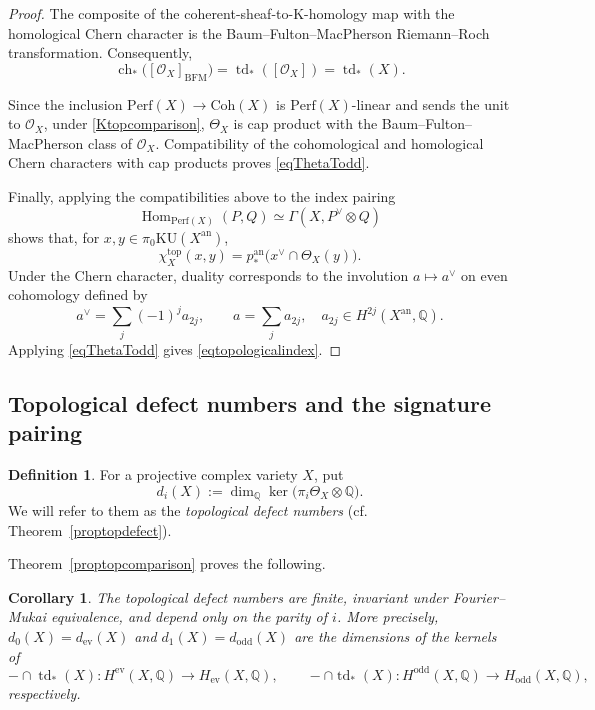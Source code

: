 \documentclass{amsart}
\theoremstyle{plain}
\newtheorem{corollary}[prop]{Corollary}
\theoremstyle{definition}
\newtheorem{defi}[prop]{Definition}
\newcommand{\bbQ}{\mathbb{Q}}
\newcommand{\Perf}{\mathrm{Perf}}
\newcommand{\K}{\mathrm{K}}
\newcommand{\KU}{\mathrm{KU}}
\newcommand{\Coh}{\mathrm{Coh}}
\DeclareMathOperator{\Hom}{Hom}
\DeclareMathOperator{\td}{td}
\newcommand{\an}{\mathrm{an}}
\begin{document}
\begin{proof}
The composite of the coherent-sheaf-to-$\K$-homology map with the homological Chern character is the Baum--Fulton--MacPherson Riemann--Roch transformation.
Consequently,
\[
\operatorname{ch}_*
\bigl([\mathcal O_X]_{\mathrm{BFM}}\bigr)
=\td_*([\mathcal O_X])=\td_*(X).
\]

Since the inclusion $\Perf(X)\to\Coh(X)$ is $\Perf(X)$-linear and sends the unit to $\mathcal O_X$, under \eqref{Ktopcomparison}, $\Theta_X$
is cap product with the Baum--Fulton--MacPherson class of $\mathcal O_X$. Compatibility of the cohomological and homological Chern characters with cap products proves \eqref{eqThetaTodd}.

Finally, applying the compatibilities above to the index pairing
\[
\Hom_{\Perf(X)}(P,Q)\simeq\Gamma(X,P^\vee\otimes Q)
\]
shows that, for
$x,y\in\pi_0\KU(X^\an)$,
\[
\chi_X^{\mathrm{top}}(x,y)
=
p^\an_*\bigl(x^\vee\cap\Theta_X(y)\bigr).
\] 
Under the Chern character, duality corresponds to the involution
$a\mapsto a^\vee$ on even cohomology defined by
\[
a^\vee=\sum_j(-1)^j a_{2j},
\qquad a=\sum_j a_{2j},\quad a_{2j}\in H^{2j}(X^\an,\bbQ).
\]
Applying \eqref{eqThetaTodd}
gives \eqref{eqtopologicalindex}.
\end{proof}




\subsection{Topological defect numbers and the signature pairing}

\begin{defi}\label{defitopdefect}
For a projective complex variety $X$, put
\begin{equation}\label{eqtopologicalkerneldimensions}
d_i(X):=\dim_{\bbQ}\ker\bigl(\pi_i\Theta_X\otimes\bbQ\bigr).
\end{equation}
We will refer to them as the \emph{topological defect numbers} (cf. Theorem~\ref{proptopdefect}).
\end{defi}

Theorem~\ref{proptopcomparison} proves the following.

\begin{corollary}
The topological defect numbers are finite, invariant under Fourier--Mukai equivalence, and depend only on the parity of $i$.
More precisely, $d_0(X)=d_{\mathrm{ev}}(X)$ and $d_1(X)=d_\mathrm{odd}(X)$ are the dimensions of the kernels of
\[
-\cap\td_*(X):H^{\mathrm{ev}}(X,\bbQ)\to H_{\mathrm{ev}}(X,\bbQ),
\qquad
-\cap\td_*(X):H^{\mathrm{odd}}(X,\bbQ)\to H_{\mathrm{odd}}(X,\bbQ),
\]
respectively.
\end{corollary}
\end{document}
